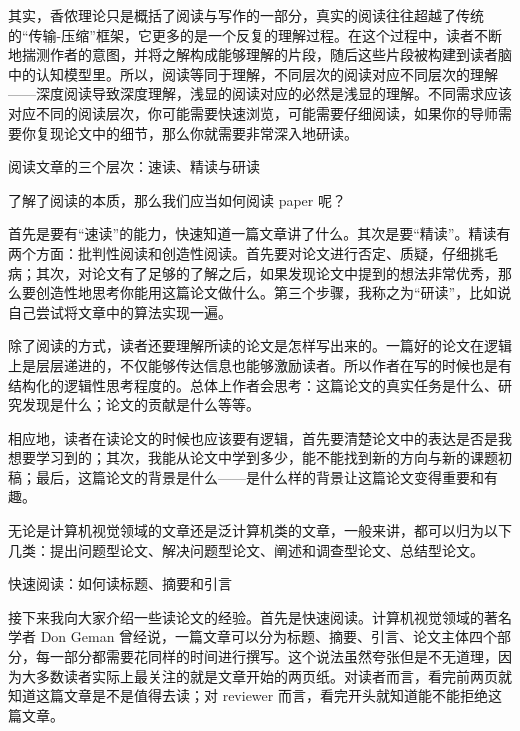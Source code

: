 其实，香侬理论只是概括了阅读与写作的一部分，真实的阅读往往超越了传统的“传输-压缩”框架，它更多的是一个反复的理解过程。在这个过程中，读者不断地揣测作者的意图，并将之解构成能够理解的片段，随后这些片段被构建到读者脑中的认知模型里。所以，阅读等同于理解，不同层次的阅读对应不同层次的理解——深度阅读导致深度理解，浅显的阅读对应的必然是浅显的理解。不同需求应该对应不同的阅读层次，你可能需要快速浏览，可能需要仔细阅读，如果你的导师需要你复现论文中的细节，那么你就需要非常深入地研读。



阅读文章的三个层次：速读、精读与研读



了解了阅读的本质，那么我们应当如何阅读 paper 呢？



首先是要有“速读”的能力，快速知道一篇文章讲了什么。其次是要“精读”。精读有两个方面：批判性阅读和创造性阅读。首先要对论文进行否定、质疑，仔细挑毛病；其次，对论文有了足够的了解之后，如果发现论文中提到的想法非常优秀，那么要创造性地思考你能用这篇论文做什么。第三个步骤，我称之为“研读”，比如说自己尝试将文章中的算法实现一遍。



除了阅读的方式，读者还要理解所读的论文是怎样写出来的。一篇好的论文在逻辑上是层层递进的，不仅能够传达信息也能够激励读者。所以作者在写的时候也是有结构化的逻辑性思考程度的。总体上作者会思考：这篇论文的真实任务是什么、研究发现是什么；论文的贡献是什么等等。



相应地，读者在读论文的时候也应该要有逻辑，首先要清楚论文中的表达是否是我想要学习到的；其次，我能从论文中学到多少，能不能找到新的方向与新的课题初稿；最后，这篇论文的背景是什么——是什么样的背景让这篇论文变得重要和有趣。



无论是计算机视觉领域的文章还是泛计算机类的文章，一般来讲，都可以归为以下几类：提出问题型论文、解决问题型论文、阐述和调查型论文、总结型论文。



快速阅读：如何读标题、摘要和引言



接下来我向大家介绍一些读论文的经验。首先是快速阅读。计算机视觉领域的著名学者 Don Geman 曾经说，一篇文章可以分为标题、摘要、引言、论文主体四个部分，每一部分都需要花同样的时间进行撰写。这个说法虽然夸张但是不无道理，因为大多数读者实际上最关注的就是文章开始的两页纸。对读者而言，看完前两页就知道这篇文章是不是值得去读；对 reviewer 而言，看完开头就知道能不能拒绝这篇文章。



